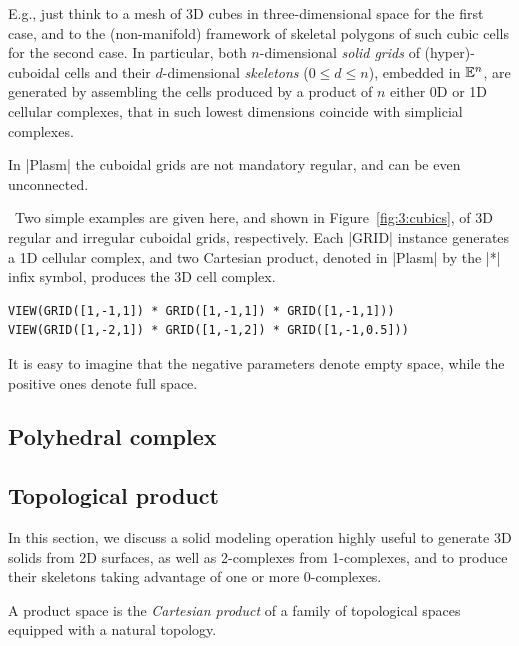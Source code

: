 E.g., just think to a mesh of 3D cubes in three-dimensional space for the first case, and to the (non-manifold) framework of skeletal polygons of such cubic cells for the second case.
In particular,  both $n$-dimensional \emph{solid grids} of (hyper)-cuboidal cells and their  $d$-dimensional \emph{skeletons} ($0\leq d\leq n$), embedded in $\mathbb{E}^n$, are generated by assembling the cells produced by a product of $n$ either 0D or 1D cellular complexes, that in such lowest dimensions coincide with {simplicial complexes}. 

In |Plasm| the cuboidal grids are not mandatory regular, and can be even unconnected. 

\begin{coding}\
Two simple examples are given here, and shown in Figure~\ref{fig:3:cubics}, of 3D regular and irregular cuboidal grids, respectively. Each |GRID| instance generates a 1D cellular complex, and two Cartesian product, denoted in |Plasm| by the |*| infix symbol, produces the 3D cell complex.
\begin{lstlisting}[language=JuliaLocal, style=julia, mathescape=false]
VIEW(GRID([1,-1,1]) * GRID([1,-1,1]) * GRID([1,-1,1]))
VIEW(GRID([1,-2,1]) * GRID([1,-1,2]) * GRID([1,-1,0.5]))
\end{lstlisting}
It is easy to imagine that the negative parameters denote empty space, while the positive ones denote full space.
\end{coding}







\subsection{Polyhedral complex}\label{sect:3-2-3}


\subsection{Topological product}
\label{subsec:2:style}

In this section, we discuss a solid modeling operation highly useful to generate 3D solids from 2D surfaces, as well as 2-complexes from 1-complexes, and to produce their skeletons taking advantage of one or more 0-complexes.

\begin{definition}
A product space is the \emph{Cartesian product} of a family of topological spaces equipped with a natural topology.
\end{definition}

